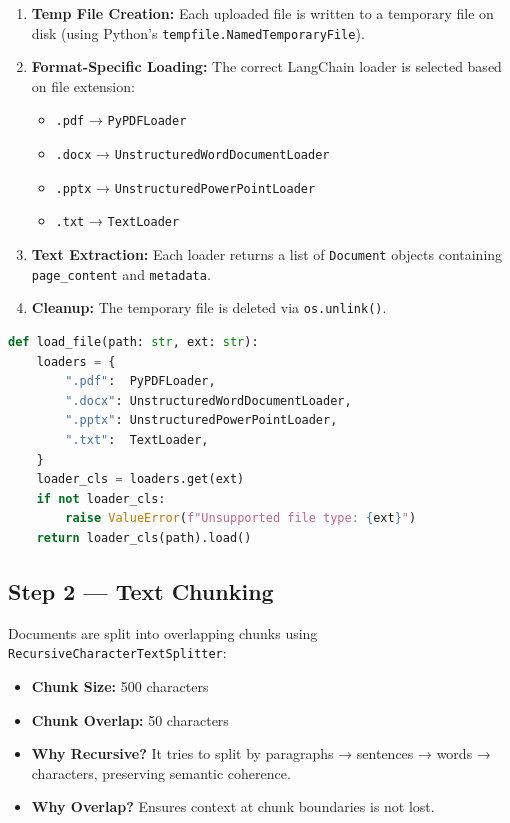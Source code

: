 \documentclass[12pt,a4paper]{article}
\begin{document}
\begin{enumerate}
  \item \textbf{Temp File Creation:} Each uploaded file is written to a temporary file on disk (using Python's \texttt{tempfile.NamedTemporaryFile}).
  \item \textbf{Format-Specific Loading:} The correct LangChain loader is selected based on file extension:
    \begin{itemize}
      \item \texttt{.pdf} → \texttt{PyPDFLoader}
      \item \texttt{.docx} → \texttt{UnstructuredWordDocumentLoader}
      \item \texttt{.pptx} → \texttt{UnstructuredPowerPointLoader}
      \item \texttt{.txt} → \texttt{TextLoader}
    \end{itemize}
  \item \textbf{Text Extraction:} Each loader returns a list of \texttt{Document} objects containing \texttt{page\_content} and \texttt{metadata}.
  \item \textbf{Cleanup:} The temporary file is deleted via \texttt{os.unlink()}.
\end{enumerate}

\begin{lstlisting}[language=Python, caption={Document loading logic in main.py}]
def load_file(path: str, ext: str):
    loaders = {
        ".pdf":  PyPDFLoader,
        ".docx": UnstructuredWordDocumentLoader,
        ".pptx": UnstructuredPowerPointLoader,
        ".txt":  TextLoader,
    }
    loader_cls = loaders.get(ext)
    if not loader_cls:
        raise ValueError(f"Unsupported file type: {ext}")
    return loader_cls(path).load()
\end{lstlisting}

\subsection{Step 2 — Text Chunking}

Documents are split into overlapping chunks using \texttt{RecursiveCharacterTextSplitter}:

\begin{itemize}
  \item \textbf{Chunk Size:} 500 characters
  \item \textbf{Chunk Overlap:} 50 characters
  \item \textbf{Why Recursive?} It tries to split by paragraphs → sentences → words → characters, preserving semantic coherence.
  \item \textbf{Why Overlap?} Ensures context at chunk boundaries is not lost.
\end{itemize}
\end{document}
